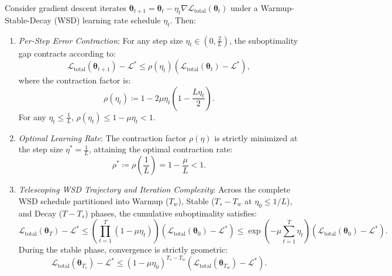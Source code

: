 \begin{theorem}
Consider gradient descent iterates $\bm{\theta}_{t+1} = \bm{\theta}_t - \eta_t \nabla \mathcal{L}_{\text{total}}(\bm{\theta}_t)$ under a Warmup-Stable-Decay (WSD) learning rate schedule $\eta_t$.
Then:
\begin{enumerate}
    \item \emph{Per-Step Error Contraction}:
    For any step size $\eta_t \in \left(0, \frac{2}{L}\right)$, the suboptimality gap contracts according to:
    \begin{equation}
    \mathcal{L}_{\text{total}}(\bm{\theta}_{t+1}) - \mathcal{L}^* \le \rho(\eta_t) \left( \mathcal{L}_{\text{total}}(\bm{\theta}_t) - \mathcal{L}^* \right),
    \label{eq:per_step_contraction}
    \end{equation}
    where the contraction factor is:
    \begin{equation}
    \rho(\eta_t) \coloneqq 1 - 2\mu \eta_t \left( 1 - \frac{L \eta_t}{2} \right).
    \label{eq:contraction_factor_formula}
    \end{equation}
    For any $\eta_t \le \frac{1}{L}$, $\rho(\eta_t) \le 1 - \mu \eta_t < 1$.
    \item \emph{Optimal Learning Rate}:
    The contraction factor $\rho(\eta)$ is strictly minimized at the step size $\eta^* = \frac{1}{L}$, attaining the optimal contraction rate:
    \begin{equation}
    \rho^* \coloneqq \rho\left(\frac{1}{L}\right) = 1 - \frac{\mu}{L} < 1.
    \label{eq:optimal_contraction_rate}
    \end{equation}
    \item \emph{Telescoping WSD Trajectory and Iteration Complexity}:
    Across the complete WSD schedule partitioned into Warmup ($T_w$), Stable ($T_s - T_w$ at $\eta_0 \le 1/L$), and Decay ($T - T_s$) phases, the cumulative suboptimality satisfies:
    \begin{equation}
    \mathcal{L}_{\text{total}}(\bm{\theta}_T) - \mathcal{L}^* \le \left( \prod_{t=1}^T (1 - \mu \eta_t) \right) \left( \mathcal{L}_{\text{total}}(\bm{\theta}_0) - \mathcal{L}^* \right) \le \exp\left( -\mu \sum_{t=1}^T \eta_t \right) \left( \mathcal{L}_{\text{total}}(\bm{\theta}_0) - \mathcal{L}^* \right).
    \label{eq:wsd_telescoping_bound}
    \end{equation}
    During the stable phase, convergence is strictly geometric:
    \begin{equation}
    \mathcal{L}_{\text{total}}(\bm{\theta}_{T_s}) - \mathcal{L}^* \le (1 - \mu \eta_0)^{T_s - T_w} \left( \mathcal{L}_{\text{total}}(\bm{\theta}_{T_w}) - \mathcal{L}^* \right).

\end{equation}
\end{enumerate}
\end{theorem}
